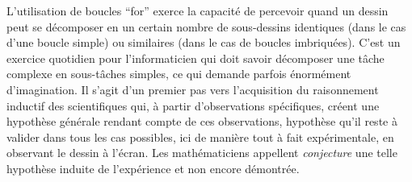 {\begin{minipage}{\myparboxwidth}
L'utilisation de boucles ``for'' exerce la capacité de percevoir
quand un dessin peut se décomposer en un certain nombre de sous-dessins
identiques (dans le cas d'une boucle simple) ou similaires (dans le cas
de boucles imbriquées). C'est un exercice quotidien pour l'informaticien
qui doit savoir décomposer une tâche complexe en sous-tâches simples,
ce qui demande parfois énormément d'imagination.
Il s'agit d'un premier pas vers l'acquisition du raisonnement
inductif des scien\-ti\-fi\-ques qui, à partir d'observations spécifiques,
créent une hypothèse générale rendant compte de ces observations,
hypothèse qu'il reste à valider dans tous les cas possibles, ici de
manière tout à fait expérimentale, en observant le dessin à
l'écran. Les mathématiciens appellent {\em conjecture} une telle
hypothèse induite de l'expérience et non encore démontrée.

\vspace{\abovedisplayskip}
\end{minipage}
}
